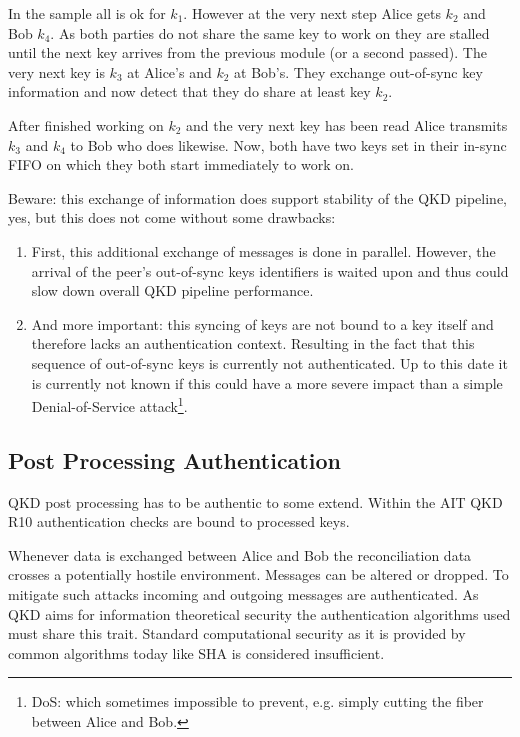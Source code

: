 \medskip

In the sample all is ok for $k_1$. However at the very next step Alice gets $k_2$ and Bob $k_4$. As both parties do not share the same key to work on they are stalled until the next key arrives from the previous module (or a second passed). The very next key is $k_3$ at Alice's and $k_2$ at Bob's. They exchange out-of-sync key information and now detect that they do share at least key $k_2$.

\medskip

After finished working on $k_2$ and the very next key has been read Alice transmits $k_3$ and $k_4$ to Bob who does likewise. Now, both have two keys set in their in-sync FIFO on which they both start immediately to work on.

\medskip

Beware: this exchange of information does support stability of the QKD pipeline, yes, but this does not come without some drawbacks:

\begin{enumerate}

\item First, this additional exchange of messages is done in parallel. However, the arrival of the peer's out-of-sync keys identifiers is waited upon and thus could slow down overall QKD pipeline performance.

\item And more important: this syncing of keys are not bound to a key itself and therefore lacks an authentication context. Resulting in the fact that this sequence of out-of-sync keys is currently not authenticated. Up to this date it is currently not known if this could have a more severe impact than a simple Denial-of-Service attack\footnote{DoS: which sometimes impossible to prevent, e.g. simply cutting the fiber between Alice and Bob.}.

\end{enumerate}


\subsection{Post Processing Authentication}
\label{subsec:Post Processing Authentication}

QKD post processing has to be authentic to some extend. Within the AIT QKD R10 authentication checks are bound to processed keys.

\medskip

Whenever data is exchanged between Alice and Bob the reconciliation data crosses a potentially hostile environment. Messages can be altered or dropped. To mitigate such attacks incoming and outgoing messages are authenticated. As QKD aims for information theoretical security the authentication algorithms used must share this trait. Standard computational security as it is provided by common algorithms today like SHA is considered insufficient.

